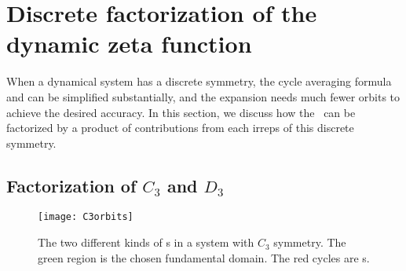 

\section{Discrete factorization of the dynamic zeta function}
\label{sect:fact}

When a dynamical system has a discrete symmetry, the cycle averaging
formula  and  can be simplified substantially,
and the expansion needs
much fewer orbits to achieve the desired accuracy.
In this section, we discuss how the \dzeta\ can be factorized by a
product of contributions from each irreps of this discrete symmetry.

\subsection{Factorization of $C_3$ and $D_3$}

\begin{figure}[h]
  \centering
  \texttt{[image: C3orbits]}
  \caption[Orbits in a system with $C_3$ symmetry.]{
    The two different kinds of \po s in a system with
    $C_3$ symmetry.
    The green region is the chosen fundamental domain.
    The red cycles are \po s.
  }
  \label{fig:C3orbits}
\end{figure}

